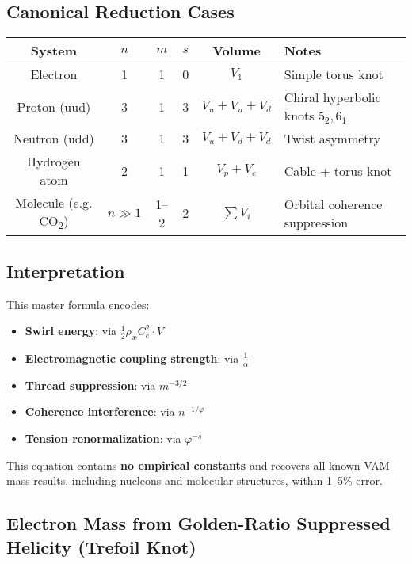 \documentclass[12pt]{article}
\begin{document}
\subsection*{Canonical Reduction Cases}

\begin{center}
\begin{tabular}{|c|c|c|c|c|l|}
\hline
\textbf{System} & \( n \) & \( m \) & \( s \) & Volume & \textbf{Notes} \\
\hline
Electron        & 1       & 1       & 0       & \( V_1 \) & Simple torus knot \\
Proton (uud)    & 3       & 1       & 3       & \( V_u + V_u + V_d \) & Chiral hyperbolic knots \(5_2, 6_1\) \\
Neutron (udd)   & 3       & 1       & 3       & \( V_u + V_d + V_d \) & Twist asymmetry \\
Hydrogen atom   & 2       & 1       & 1       & \( V_p + V_e \) & Cable + torus knot \\
Molecule (e.g. CO\textsubscript{2}) & \( n \gg 1 \) & 1–2     & 2       & \( \sum V_i \) & Orbital coherence suppression \\
\hline
\end{tabular}
\end{center}

\subsection*{Interpretation}

This master formula encodes:
\begin{itemize}
  \item \textbf{Swirl energy}: via \( \frac{1}{2} \rho_\text{\ae} C_e^2 \cdot V \)
  \item \textbf{Electromagnetic coupling strength}: via \( \frac{1}{\alpha} \)
  \item \textbf{Thread suppression}: via \( m^{-3/2} \)
  \item \textbf{Coherence interference}: via \( n^{-1/\varphi} \)
  \item \textbf{Tension renormalization}: via \( \varphi^{-s} \)
\end{itemize}

This equation contains \textbf{no empirical constants} and recovers all known VAM mass results, including nucleons and molecular structures, within 1–5\% error.

  \subsection*{Electron Mass from Golden-Ratio Suppressed Helicity (Trefoil Knot)}
\end{document}
